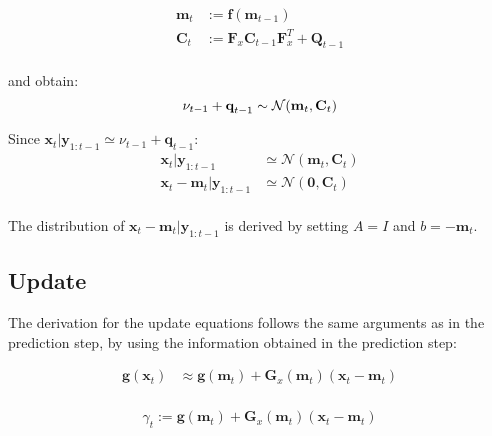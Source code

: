 \documentclass[
]{article}
\begin{document}
\[
\begin{equation*}
    \begin{aligned}
        \textbf{m}_t & := \textbf{f}(\textbf{m}_{t-1}) \\
        \textbf{C}_t & := \textbf{F}_x\textbf{C}_{t-1}\textbf{F}_x^T + \textbf{Q}_{t-1}\\        
    \end{aligned}
\end{equation*}
\]

and obtain: \[
\begin{equation*}
    \nu_{t-1} + \textbf{q}_{t-1} \sim \mathcal{N}(\textbf{m}_t, \textbf{C}_t)\\
\end{equation*}
\]

Since
\(\textbf{x}_t| \textbf{y}_{1:t-1}\simeq \nu_{t-1} + \textbf{q}_{t-1}\):
\[
\begin{equation*} 
    \begin{aligned}
        \textbf{x}_t|\textbf{y}_{1:t-1} &\simeq \mathcal{N}(\textbf{m}_t, \textbf{C}_t)\\
        \textbf{x}_t - \textbf{m}_{t}|\textbf{y}_{1:t-1} &\simeq \mathcal{N}(\textbf{0}, \textbf{C}_t)\\
    \end{aligned}
\end{equation*}
\]

The distribution of \(\textbf{x}_t - \textbf{m}_{t}|\textbf{y}_{1:t-1}\)
is derived by setting \(A = I\) and \(b = -\textbf{m}_{t}\).

\hypertarget{update-1}{%
\subsection{Update}\label{update-1}}

The derivation for the update equations follows the same arguments as in
the prediction step, by using the information obtained in the prediction
step:

\[
\begin{equation*}
    \begin{aligned}
        \textbf{g}(\textbf{x}_{t}) &\approx \textbf{g}(\textbf{m}_{t}) + \textbf{G}_x(\textbf{m}_{t})(\textbf{x}_{t} - \textbf{m}_{t})  \\
    \end{aligned}
\end{equation*}
\]

\[
\begin{equation*} 
    \begin{aligned}
        \gamma_t := \textbf{g}(\textbf{m}_{t}) + \textbf{G}_x(\textbf{m}_{t})(\textbf{x}_{t} - \textbf{m}_{t})
    \end{aligned}
\end{equation*}    
\]
\end{document}
